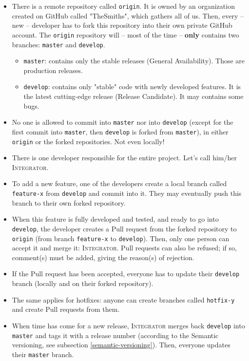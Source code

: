\begin{itemize}
  \item There is a remote repository called \lstinline{origin}. It is owned by an organization created on GitHub called "TheSmiths", which gathers all of us. Then, every -- new -- developer has to fork this repository into their own private GitHub account. The \lstinline{origin} repository will -- most of the time -- \textbf{only} contains two branches: \lstinline{master} and \lstinline{develop}.
  \begin{itemize}
    \item \lstinline{master}: contains only the stable releases (General Availability). Those are production releases.
    \item \lstinline{develop}: contains only "stable" code with newly developed features. It is the latest cutting-edge release (Release Candidate). It may contains some bugs.
  \end{itemize}
  \item No one is allowed to commit into \lstinline{master} nor into \lstinline{develop} (except for the first commit into \lstinline{master}, then \lstinline{develop} is forked from \lstinline{master}), in either \lstinline{origin} or the forked repositories. Not even locally!
  \item There is one developer responsible for the entire project. Let's call him/her \textsc{Integrator}.
  \item To add a new feature, one of the developers create a local branch called \lstinline{feature-x} from \lstinline{develop} and commit into it. They may eventually push this branch to their own forked repository.
  \item When this feature is fully developed and tested, and ready to go into \lstinline{develop}, the developer creates a Pull request from the forked repository to \lstinline{origin} (from branch \lstinline{feature-x} to \lstinline{develop}). Then, only one person can accept it and merge it: \textsc{Integrator}. Pull requests can also be refused; if so, comment(s) must be added, giving the reason(s) of rejection.
  \item If the Pull request has been accepted, everyone has to update their \lstinline{develop} branch (locally and on their forked repository).
  \item The same applies for hotfixes: anyone can create branches called \lstinline{hotfix-y} and create Pull requests from them.
  \item When time has come for a new release, \textsc{Integrator} merges back \lstinline{develop} into \lstinline{master} and tags it with a release number (according to the Semantic versioning, see subsection \ref{semantic-versioning}). Then, everyone updates their \lstinline{master} branch.
\end{itemize}

